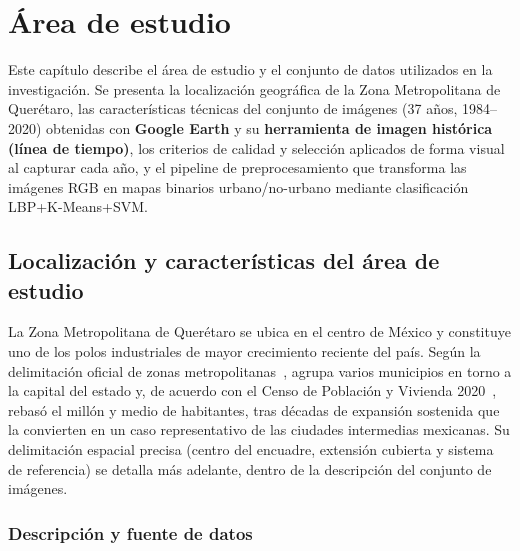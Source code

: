 
\chapter{Área de estudio}
\label{ch:area-estudio}

\begin{resumen}
Este capítulo describe el área de estudio y el conjunto de datos utilizados en la investigación. Se presenta la localización geográfica de la Zona Metropolitana de Querétaro, las características técnicas del conjunto de imágenes (37 años, 1984--2020) obtenidas con \textbf{Google Earth} y su \textbf{herramienta de imagen histórica (línea de tiempo)}, los criterios de calidad y selección aplicados de forma visual al capturar cada año, y el pipeline de preprocesamiento que transforma las imágenes RGB en mapas binarios urbano/no-urbano mediante clasificación LBP+K-Means+SVM.
\end{resumen}

\section{Localización y características del área de estudio}

La Zona Metropolitana de Querétaro se ubica en el centro de México y constituye uno de los polos industriales de mayor crecimiento reciente del país. Según la delimitación oficial de zonas metropolitanas~\parencite{CONAPO2018Delimitacion}, agrupa varios municipios en torno a la capital del estado y, de acuerdo con el Censo de Población y Vivienda 2020~\parencite{INEGI2020Censo}, rebasó el millón y medio de habitantes, tras décadas de expansión sostenida que la convierten en un caso representativo de las ciudades intermedias mexicanas. Su delimitación espacial precisa (centro del encuadre, extensión cubierta y sistema de referencia) se detalla más adelante, dentro de la descripción del conjunto de imágenes.

\subsection{Descripción y fuente de datos}

